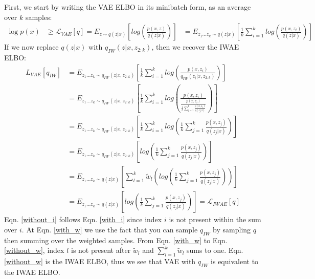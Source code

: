 \documentclass{article} %
\begin{document}
First, we start by writing the VAE ELBO in its minibatch form, as an average over $k$ samples:
\begin{align} 
    \log p(x) &\geq 
    \mathcal{L}_{VAE}[q] =
    E_{z \sim q(z|x)} \left[  log\left(\frac{p(x,z)}{q(z|x)} \right) \right]  
    &= E_{z_{1}...z_{k} \sim q(z|x)} \left[  \frac{1}{k}\sum_{i=1}^k log\left(\frac{p(x,z_i)}{q(z|x)} \right) \right]
\end{align}
If we now replace $q(z|x)$ with $q_{IW}(z|x,z_{2:k})$, then we recover the IWAE ELBO:
\begin{align}
    L_{VAE}[q_{IW}] &= E_{z_{1}...z_{k} \sim q_{IW}(z|x,z_{2:k})} \left[  \frac{1}{k}\sum_{i=1}^k log\left(\frac{p(x,z_i)}{q_{IW}(z_i|x,z_{2:k})}  \right)  \right] \\
    &= E_{z_{1}...z_{k} \sim q_{IW}(z|x,z_{2:k})} \left[  \frac{1}{k}\sum_{i=1}^k log\left(\frac{p(x,z_i)}{\frac{p(x,z_i)}{\frac{1}{k}   \sum_{j=1}^k \frac{p(x,z_j)}{q(z_j|x)}}}  \right)  \right] \\
    &= E_{z_{1}...z_{k} \sim q_{IW}(z|x,z_{2:k})} \left[  \frac{1}{k}\sum_{i=1}^k log\left(\frac{1}{k} \sum_{j=1}^k \frac{p(x,z_j)}{q(z_j|x)}\right)  \right] \label{with_i} \\
    &= E_{z_{1}...z_{k} \sim q_{IW}(z|x,z_{2:k})} \left[ log\left(\frac{1}{k} \sum_{j=1}^k \frac{p(x,z_j)}{q(z_j|x)}\right)  \right]  \label{without_i} \\
    &= E_{z_{1}...z_{k} \sim q(z|x)} \left[  \sum_{l=1}^k \tilde w_l  \left( log\left(\frac{1}{k} \sum_{j=1}^k \frac{p(x,z_j)}{q(z_j|x)}\right)\right)  \right] \label{with_w} \\ 
    &= E_{z_{1}...z_{k} \sim q(z|x)} \left[  log\left(\frac{1}{k}\sum_{j=1}^k \frac{p(x,z_j)}{q(z_j|x)}  \right)  \right] = \mathcal{L}_{IWAE}[q] \label{without_w}
\end{align}
Eqn. \ref{without_i} follows Eqn. \ref{with_i} since index $i$ is not present within the sum over $i$. At Eqn. \ref{with_w} we use the fact that you can sample $q_{IW}$ by sampling $q$ then summing over the weighted samples. From Eqn. \ref{with_w} to Eqn. \ref{without_w}, index $l$ is not present after $\tilde w_l$ and $\sum_{l=1}^k \tilde w_l$ sums to one. Eqn. \ref{without_w} is the IWAE ELBO, thus we see that VAE with $q_{IW}$ is equivalent to the IWAE ELBO.
\end{document}
